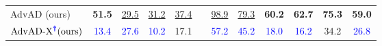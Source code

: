 \documentclass{article}
\begin{document}
\begin{table}[t]
{\begin{tabular}{lccccccccccc}
        AdvAD (ours)                & \textbf{51.5}     & \quad\underline{29.5}\quad      & \underline{31.2}  & \underline{37.4}   &    & \underline{98.9}      & \underline{79.3}      & \textbf{60.2}      & \textbf{62.7}    & \textbf{75.3}    & \textbf{59.0} \\
        $\text{AdvAD-X}^{\textcolor{blue}{\boldsymbol{\dag}}} \text{(ours)}$              & \textcolor{blue}{13.4}   & \quad\textcolor{blue}{27.6}\quad      & \textcolor{blue}{10.2}  & 17.1   &    & \textcolor{blue}{57.2}       & \textcolor{blue}{45.2}      & \textcolor{blue}{18.0}      & \textcolor{blue}{16.2}   & 34.2   & \textcolor{blue}{26.8} \\
        \bottomrule
    \end{tabular}}
    \vspace{-0.5cm}
\end{table}
\end{document}
